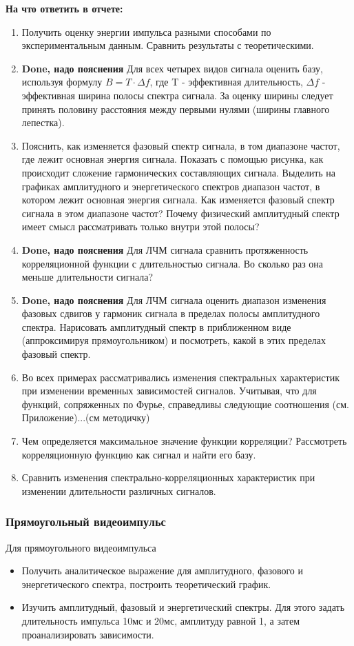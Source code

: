 \textbf{На что ответить в отчете:}
\begin{enumerate}
    \item Получить оценку энергии импульса разными способами по
    экспериментальным данным. Сравнить результаты с
    теоретическими.
    \item \textbf{Done, надо пояснения} Для всех четырех видов сигнала оценить базу,
    используя формулу
    $B=T \cdot \Delta f$, где T - эффективная длительность, $\Delta f$ - эффективная
    ширина полосы спектра сигнала. За оценку ширины следует
    принять половину расстояния между первыми нулями (ширины
    главного лепестка).
    \item Пояснить, как изменяется фазовый спектр сигнала, в том диапазоне
    частот, где лежит основная энергия сигнала. Показать с помощью
    рисунка, как происходит сложение гармонических составляющих
    сигнала. Выделить на графиках амплитудного и энергетического
    спектров диапазон частот, в котором лежит основная энергия
    сигнала. Как изменяется фазовый спектр сигнала в этом диапазоне
    частот? Почему физический амплитудный спектр имеет смысл
    рассматривать только внутри этой полосы?
    \item \textbf{Done, надо пояснения} Для ЛЧМ сигнала сравнить протяженность корреляционной
    функции с длительностью сигнала. Во сколько раз она меньше
    длительности сигнала?
    \item \textbf{Done, надо пояснения} Для ЛЧМ сигнала оценить диапазон изменения фазовых сдвигов у
    гармоник сигнала в пределах полосы амплитудного спектра.
    Нарисовать амплитудный спектр в приближенном виде
    (аппроксимируя прямоугольником) и посмотреть, какой в этих
    пределах фазовый спектр.
    \item Во всех примерах рассматривались изменения спектральных
    характеристик при изменении временных зависимостей сигналов.
    Учитывая, что для функций, сопряженных по Фурье, справедливы
    следующие соотношения (см. Приложение)...(см методичку)
    \item Чем определяется максимальное значение функции корреляции?
    Рассмотреть корреляционную функцию как сигнал и найти его базу.
    \item Сравнить изменения спектрально-корреляционных характеристик
    при изменении длительности различных сигналов.
\end{enumerate}


\subsubsection{Прямоугольный видеоимпульс}
Для прямоугольного видеоимпульса
\begin{itemize}
    \item Получить аналитическое выражение для амплитудного, фазового и
    энергетического спектра, построить теоретический график.
    \item Изучить амплитудный, фазовый и энергетический спектры. Для этого
    задать длительность импульса 10мс и 20мс, амплитуду равной 1, а затем
    проанализировать зависимости.
\end{itemize}

